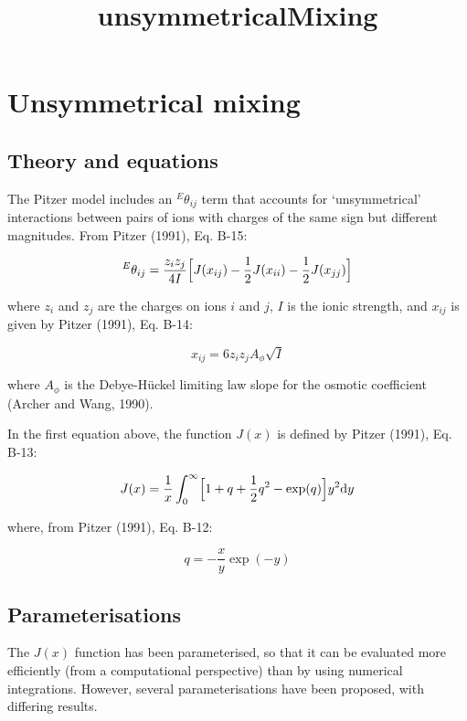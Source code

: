 \documentclass[11pt]{article}
\title{unsymmetricalMixing}
\begin{document}
    
    
    \maketitle
    
    

    
    \hypertarget{unsymmetrical-mixing}{%
\section{Unsymmetrical mixing}\label{unsymmetrical-mixing}}

\hypertarget{theory-and-equations}{%
\subsection{Theory and equations}\label{theory-and-equations}}

The Pitzer model includes an \(^E\theta_{ij}\) term that accounts for
`unsymmetrical' interactions between pairs of ions with charges of the
same sign but different magnitudes. From Pitzer (1991), Eq. B-15:

\[ ^E\theta_{ij} = \frac{z_iz_j}{4I} \Bigl[ J(x_{ij}) - \frac{1}{2} J(x_{ii}) - \frac{1}{2} J(x_{jj}) \Bigr] \]

where \(z_i\) and \(z_j\) are the charges on ions \(i\) and \(j\), \(I\)
is the ionic strength, and \(x_{ij}\) is given by Pitzer (1991), Eq.
B-14:

\[ x_{ij} = 6 z_i z_j A_\phi \sqrt{I} \]

where \(A_\phi\) is the Debye-Hückel limiting law slope for the osmotic
coefficient (Archer and Wang, 1990).

In the first equation above, the function \(J(x)\) is defined by Pitzer
(1991), Eq. B-13:

\[ J(x) = \frac{1}{x} \int_0^\infty \Bigl[ 1 + q + \frac{1}{2}q^2 - \exp(q) \Bigr] y^2 \mathrm{d}y \]

where, from Pitzer (1991), Eq. B-12:

\[ q = - \frac{x}{y} \exp(-y) \]

\hypertarget{parameterisations}{%
\subsection{Parameterisations}\label{parameterisations}}

The \(J(x)\) function has been parameterised, so that it can be
evaluated more efficiently (from a computational perspective) than by
using numerical integrations. However, several parameterisations have
been proposed, with differing results.
\end{document}

